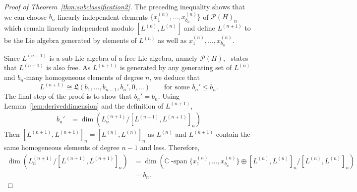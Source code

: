 \documentclass[11pt]{amsart}
\theoremstyle{definition}
\numberwithin{equation}{section}
\def\CC{{\mathbb C}}
\begin{document}
\begin{proof}[Proof of Theorem~\ref{thm:subclassification2}]
The preceding inequality shows that we can choose $b_{n}$ linearly independent elements $\{x^{(n)}_{1}, \ldots, x^{(n)}_{b_{n}}\}$ of $\mathcal{P}(H)_{n}$ which remain linearly independent modulo $[L^{(n)}, L^{(n)}]$ and define $L^{(n+1)}$ to be the Lie algebra generated by  elements of $L^{(n)}$ as well as $x^{(n)}_{1}, \ldots, x^{(n)}_{b_{n}}$.

Since $L^{(n+1)}$ is a sub-Lie algebra of a free Lie algebra, namely $\mathcal{P}(H)$,~\cite[Theorem 2.2]{MSZ} states that $L^{(n+1)}$ is also free.  
As $L^{(n+1)}$ is generated by any generating set of $L^{(n)}$ and $b_{n}$-many homogeneous elements of degree $n$, we deduce that
\[
L^{(n+1)} \cong \mathfrak{L}(b_{1}, \ldots, b_{n-1}, b_{n}', 0, \ldots )
\qquad\text{for some $b_{n}' \le b_{n}$}.
\]
The final step of the proof is to show that $b_{n}' = b_{n}$.  Using Lemma~\ref{lem:deriveddimension} and the definition of $L^{(n+1)}$,
\begin{align*}
b_{n}' &= \dim\left( L^{(n+1)}_{n} \big/ [L^{(n+1)}, L^{(n+1)}]_{n}\right)%
\end{align*}
Then $[L^{(n+1)}, L^{(n+1)}]_{n} = [L^{(n)}, L^{(n)}]_{n}$ as $L^{(n)}$ and $L^{(n+1)}$ contain the same homogeneous elements of degree $n - 1$ and less.  Therefore,
\begin{align*}
 \dim\!\left( L^{(n+1)}_{n} \big/ [L^{(n+1)}, L^{(n+1)}]_{n}\right) 
&= \dim\!\left(  \CC\operatorname{-span}\{x^{(n)}_{1}, \ldots, x^{(n)}_{b_{n}}\} \oplus [L^{(n)}, L^{(n)}]_{n} \big/ [L^{(n)}, L^{(n)}]_{n} \right) \\
&= b_{n}.
\end{align*}
\end{proof}
\end{document}

